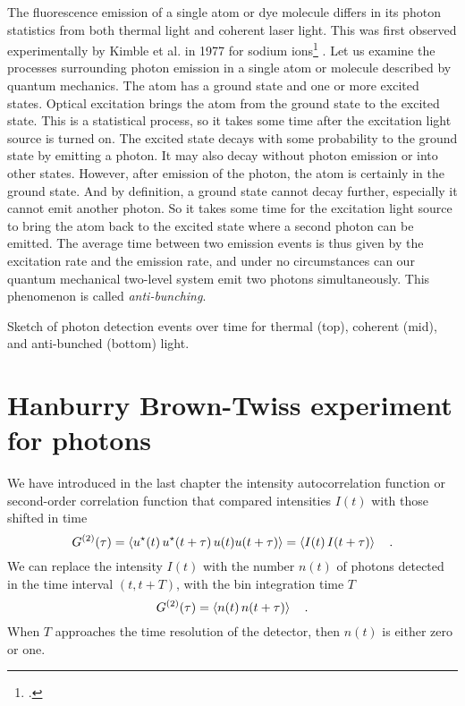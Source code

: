 The fluorescence emission of a single atom or dye molecule differs in its photon statistics from both thermal light and coherent laser light. This was first observed experimentally by Kimble et al. in 1977 for sodium ions\footcite{Kimble1977} . Let us examine the processes surrounding photon emission in a single atom or molecule described by quantum mechanics. The atom has a ground state and one or more excited states. Optical excitation brings the atom from the ground state to the excited state. This is a statistical process, so it takes some time after the excitation light source is turned on. The excited state decays with some probability to the ground state by emitting a photon. It may also decay without photon emission or into other states. However, after emission of the photon, the atom is certainly in the ground state. And by definition, a ground state cannot decay further, especially it cannot emit another photon. So it takes some time for the excitation light source to bring the atom back to the excited state where a second photon can be emitted. The average time between two emission events is thus given by the excitation rate and the emission rate, and under no circumstances can our quantum mechanical two-level system emit two photons simultaneously. This phenomenon is called \emph{anti-bunching}.

\begin{marginfigure}
    \caption{Sketch of photon detection events over time for thermal (top), coherent (mid), and anti-bunched (bottom) light.}
\end{marginfigure}


\section{Hanburry Brown-Twiss experiment for photons}

We have introduced in the last chapter the intensity autocorrelation function or second-order correlation function that compared intensities $I(t)$ with those shifted in time
\begin{equation}
    G^{(2)}(\tau) = \braket{u^\star(t) \,  u^\star(t+\tau) \,  u( t) u( t + \tau)} 
    =  \braket{I(t) \,  I(t+\tau) }  \quad .
\end{equation}
We can replace the intensity $I(t)$ with the number $n(t)$ of photons detected in the time interval $(t, t+T)$, with the bin integration time $T$
\begin{equation}
    G^{(2)}(\tau)     =  \braket{n(t) \,  n(t+\tau) }  \quad .
\end{equation}
When $T$ approaches the time resolution of the detector, then $n(t)$ is either zero or one. 

